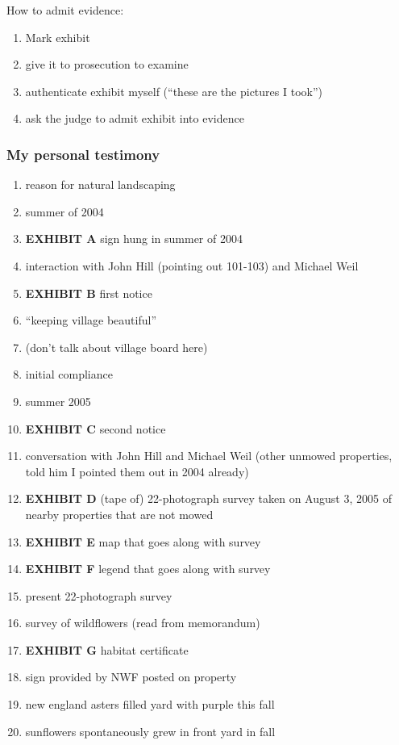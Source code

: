 \documentclass[12pt]{article}
\begin{document}
How to admit evidence:
\begin{enumerate}
\item Mark exhibit
\item give it to prosecution to examine
\item authenticate exhibit myself (``these are the pictures I took'')
\item ask the judge to admit exhibit into evidence
\end{enumerate}


\subsubsection{My personal testimony}

\begin{enumerate}
\item reason for natural landscaping
\item summer of 2004
\item {\bf EXHIBIT A} sign hung in summer of 2004
\item interaction with John Hill (pointing out 101-103) and Michael Weil
\item {\bf EXHIBIT B} first notice
\item ``keeping village beautiful''
\item (don't talk about village board here)
\item initial compliance
\item summer 2005
\item {\bf EXHIBIT C} second notice
\item conversation with John Hill and Michael Weil (other unmowed properties, told him I pointed them out in 2004 already)
\item {\bf EXHIBIT D} (tape of) 22-photograph survey taken on August 3, 2005 of nearby properties that are not mowed 
\item {\bf EXHIBIT E} map that goes along with survey
\item {\bf EXHIBIT F} legend that goes along with survey
\item present 22-photograph survey
\item survey of wildflowers (read from memorandum)
\item {\bf EXHIBIT G} habitat certificate
\item sign provided by NWF posted on property
\item new england asters filled yard with purple this fall
\item sunflowers spontaneously grew in front yard in fall
\end{enumerate}
\end{document}
